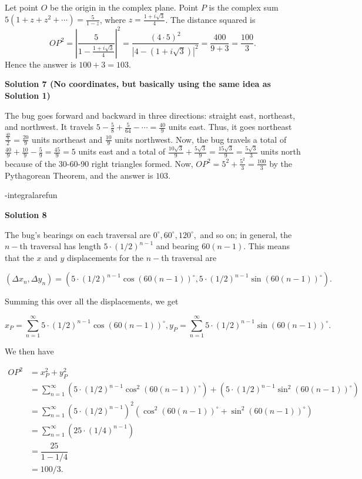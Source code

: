 \begin{enumerate}
Let point $O$ be the origin in the complex plane. Point $P$ is the complex sum $5(1+z+z^2+\cdots) = \frac{5}{1-z}$, where $z=\frac{1+i\sqrt3}4$. The distance squared is
 \[{OP}^2=\left|\frac5{1-\frac{1+i\sqrt3}4}\right|^{2}= \frac{(4\cdot5)^2}{\left|4-(1+i\sqrt3)\right|^2}=\frac{400}{9+3}=\frac{100}3.\]Hence the answer is $100 + 3 = \boxed{103}$.

 



\textbf{Solution 7 (No coordinates, but basically using the same idea as Solution 1)}

The bug goes forward and backward in three directions: straight east, northeast, and northwest. It travels $5-\frac{5}{8}+\frac{5}{64}-\cdots=\frac{40}{9}$ units east. Thus, it goes northeast $\frac{\frac{40}{9}}{2}=\frac{20}{9}$ units northeast and $\frac{10}{9}$ units northwest. Now, the bug travels a total of $\frac{40}{9}+\frac{10}{9}-\frac{5}{9}=\frac{45}{9}=5$ units east and a total of $\frac{10\sqrt{3}}{9}+\frac{5\sqrt{3}}{9}=\frac{15\sqrt{3}}{9}=\frac{5\sqrt{3}}{3}$ units north because of the 30-60-90 right triangles formed. Now, $OP^2=5^2+\frac{5^2}{3}=\frac{100}{3}$ by the Pythagorean Theorem, and the answer is $\boxed{103}$.

 -integralarefun

 



\textbf{Solution 8}

The bug's bearings on each traversal are $0^\circ, 60^\circ, 120^\circ,$ and so on; in general, the $n-$th traversal has length $5\cdot (1/2)^{n-1}$ and bearing $60(n-1).$ This means that the $x$ and $y$ displacements for the $n-$th traversal are

 
 \[(\Delta x_n, \Delta y_n)=(5\cdot (1/2)^{n-1}\cos (60(n-1))^\circ,5\cdot (1/2)^{n-1}\sin (60(n-1))^\circ).\]

 Summing this over all the displacements, we get

 
 \[x_P=\sum_{n=1}^{\infty} 5\cdot (1/2)^{n-1}\cos (60(n-1))^\circ, y_P=\sum_{n=1}^{\infty} 5\cdot (1/2)^{n-1}\sin (60(n-1))^\circ.\]

 We then have 

 
 \begin{align} OP^2 &= x_P^2+y_P^2 \\ &=\sum_{n=1}^{\infty} (5\cdot (1/2)^{n-1}\cos ^2(60(n-1))^\circ) + (5\cdot (1/2)^{n-1}\sin ^2(60(n-1))^\circ) \\ &= \sum_{n=1}^{\infty} (5\cdot (1/2)^{n-1})^2(\cos ^2 (60(n-1))^\circ+\sin ^2 (60(n-1))^\circ) \\ &= \sum_{n=1}^{\infty} (25\cdot (1/4)^{n-1}) \\ &= \dfrac{25}{1-1/4} \\ &= 100/3. \end{align}


\end{enumerate}
